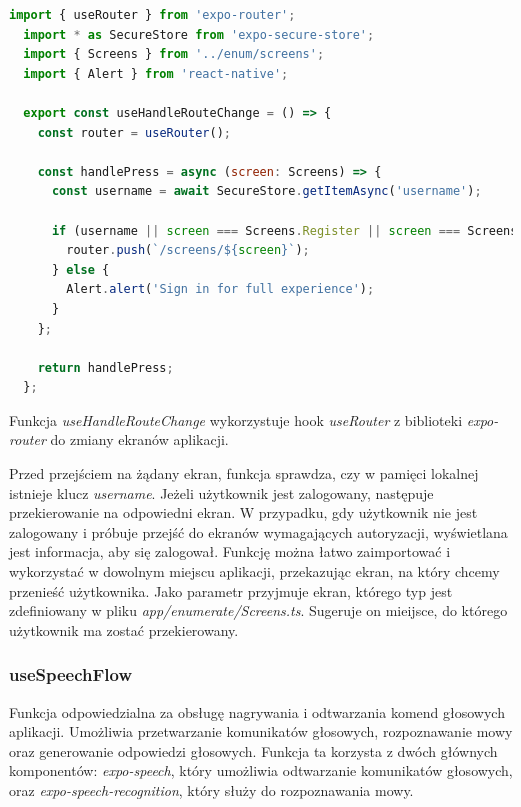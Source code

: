 \begin{lstlisting}[language=JavaScript, caption=useHandleRouteChangeHook, label=lst:hook_route]
  import { useRouter } from 'expo-router';
  import * as SecureStore from 'expo-secure-store';
  import { Screens } from '../enum/screens';
  import { Alert } from 'react-native';

  export const useHandleRouteChange = () => {
    const router = useRouter();

    const handlePress = async (screen: Screens) => {
      const username = await SecureStore.getItemAsync('username');

      if (username || screen === Screens.Register || screen === Screens.Login) {
        router.push(`/screens/${screen}`);
      } else {
        Alert.alert('Sign in for full experience');
      }
    };

    return handlePress;
  };
\end{lstlisting}
      
Funkcja \textit{useHandleRouteChange} wykorzystuje hook \textit{useRouter} z biblioteki \textit{expo-router} do zmiany ekranów aplikacji. 

Przed przejściem na żądany ekran, funkcja sprawdza, czy w pamięci lokalnej istnieje klucz \textit{username}. Jeżeli użytkownik jest zalogowany, następuje przekierowanie na odpowiedni ekran. W przypadku, gdy użytkownik nie jest zalogowany i próbuje przejść do ekranów wymagających autoryzacji, wyświetlana jest informacja, aby się zalogował. Funkcję można łatwo zaimportować i wykorzystać w dowolnym miejscu aplikacji, przekazując ekran, na który chcemy przenieść użytkownika. Jako parametr przyjmuje ekran, którego typ jest zdefiniowany w pliku \textit{app/enumerate/Screens.ts}. Sugeruje on mieijsce, do którego użytkownik ma zostać przekierowany.

\subsubsection{useSpeechFlow} 

Funkcja odpowiedzialna za obsługę nagrywania i odtwarzania komend głosowych aplikacji. Umożliwia przetwarzanie komunikatów głosowych, rozpoznawanie mowy oraz generowanie odpowiedzi głosowych. Funkcja ta korzysta z dwóch głównych komponentów: \textit{expo-speech}, który umożliwia odtwarzanie komunikatów głosowych, oraz \textit{expo-speech-recognition}, który służy do rozpoznawania mowy.

